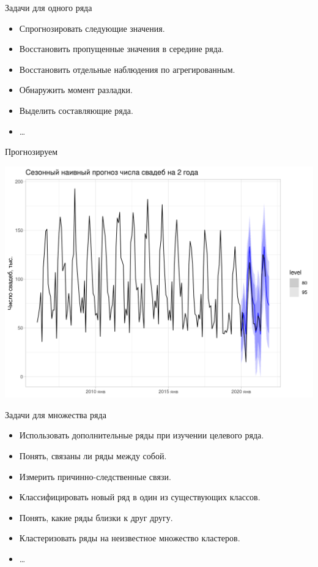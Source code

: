 \begin{frame}{Задачи для одного ряда}

\begin{itemize}[<+->]
  \item Спрогнозировать следующие значения.
  \item Восстановить пропущенные значения в середине ряда.
  \item Восстановить отдельные наблюдения по агрегированным.
  \item Обнаружить момент разладки.
  \item Выделить составляющие ряда. 
  \item \ldots 
\end{itemize}

\end{frame}


\begin{frame}{Прогнозируем}

  \includegraphics[width=\textwidth]{pictures/om_ts_01-017.png}

\end{frame}


\begin{frame}{Задачи для множества ряда}

  \begin{itemize}[<+->]
    \item Использовать дополнительные ряды при изучении целевого ряда.
    \item Понять, связаны ли ряды между собой.
    \item Измерить причинно-следственные связи.
    \item Классифицировать новый ряд в один из существующих классов.
    \item Понять, какие ряды близки к друг другу.
    \item Кластеризовать ряды на неизвестное множество кластеров.
    \item \ldots
  \end{itemize}
  
\end{frame}
  
